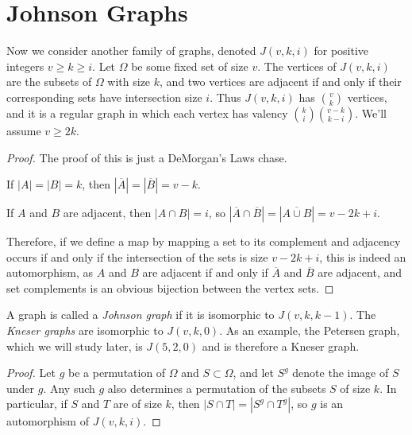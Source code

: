 \section*{Johnson Graphs}

Now we consider another family of graphs, denoted $J(v,k,i)$ for positive integers $v\geq k\geq i$.  Let $\Omega$ be some fixed set of size $v$.  The vertices of $J(v,k,i)$ are the subsets of $\Omega$ with size $k$, and two vertices are adjacent if and only if their corresponding sets have intersection size $i$.  Thus $J(v,k,i)$ has $\binom{v}{k}$ vertices, and it is a regular graph in which each vertex has valency $\binom{k}{i}\binom{v-k}{k-i}$.  We'll assume $v\geq 2k$.


\begin{proof}
	The proof of this is just a DeMorgan's Laws chase.  
	
	If $|A|=|B|=k$, then $|\overline{A}|=|\overline{B}|=v-k$.
	
	If $A$ and $B$ are adjacent, then $|A\cap B|=i$, so $|\overline{A}\cap\overline{B}| = |\overline{A\cup B}| = v-2k+i$.
	
	Therefore, if we define a map by mapping a set to its complement and adjacency occurs if and only if the intersection of the sets is size $v-2k+i$, this is indeed an automorphism, as $A$ and $B$ are adjacent if and only if $\overline{A}$ and $\overline{B}$ are adjacent, and set complements is an obvious bijection between the vertex sets.
	
	
	
\end{proof}

A graph is called a \textit{Johnson graph} if it is isomorphic to $J(v,k,k-1)$.  The \textit{Kneser graphs} are isomorphic to $J(v,k,0)$.  As an example, the Petersen graph, which we will study later, is $J(5,2,0)$ and is therefore a Kneser graph.


\begin{proof}
	Let $g$ be a permutation of $\Omega$ and $S\subset \Omega$, and let $S^g$ denote the image of $S$ under $g$.  Any such $g$ also determines a permutation of the subsets $S$ of size $k$.  In particular, if $S$ and $T$ are of size $k$, then $|S\cap T|=|S^g\cap T^g|$, so $g$ is an automorphism of $J(v,k,i)$.
\end{proof}

